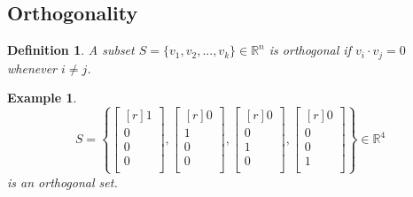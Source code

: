 \documentclass{report}
\newtheorem*{ex}{Example}
\newtheorem*{defn}{Definition}
\begin{document}
\subsection{Orthogonality}
\begin{defn}
A subset $S=\{v_1,v_2,...,v_k\}\in \mathbb{R}^n$ is orthogonal if $v_i \cdot v_j = 0$ whenever $i \neq j$.
\end{defn}
\begin{ex}
\[ S=\left \{ \begin{bmatrix}[r]1\\0\\0\\0\\\end{bmatrix},\begin{bmatrix}[r]0\\1\\0\\0\\\end{bmatrix},\begin{bmatrix}[r]0\\0\\1\\0\\\end{bmatrix},\begin{bmatrix}[r]0\\0\\0\\1\\\end{bmatrix}\right\}\in \mathbb{R}^4 \]
is an orthogonal set.
\end{ex}
\end{document}
